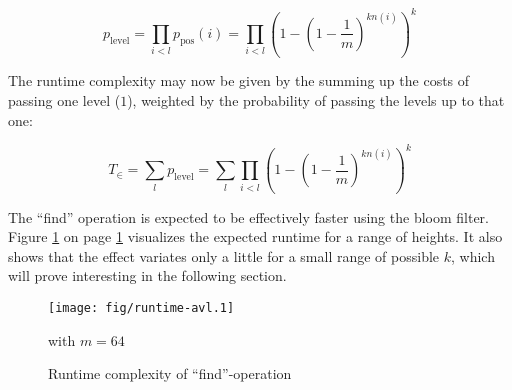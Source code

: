         \begin{equation}
            p_\mathrm{level} = \prod_{i<l} p_\mathrm{pos}(i) =
            \prod_{i<l} \left(1 - \left(1 - \frac{1}{m}\right)^{kn(i)}\right)^k
        \end{equation}

        The runtime complexity may now be given by the summing up the costs of
        passing one level ($1$), weighted by the probability of passing the
        levels up to that one:

        \begin{equation}
            T_{\in} = \sum_l p_\mathrm{level} =
            \sum_l \prod_{i<l}
            \left(1 - \left(1 - \frac{1}{m}\right)^{kn(i)}\right)^k
            \label{eq:parameters-AVL_find-T}
        \end{equation}

        The ``find'' operation is expected to be effectively faster using the
        bloom filter.
        Figure \ref{fig:parameters-AVL_bloom-runtime_find} on page
        \ref{fig:parameters-AVL_bloom-runtime_find} visualizes the expected
        runtime for a range of heights.
        It also shows that the effect variates only a little for a small range
        of possible $k$, which will prove interesting in the following section.

        \begin{figure}[!h]
            \caption{Runtime complexity of ``find''-operation}
            \label{fig:parameters-AVL_bloom-runtime_find}
            \begin{center}
                \texttt{[image: fig/runtime-avl.1]}

                with $m=64$
            \end{center}
        \end{figure}

